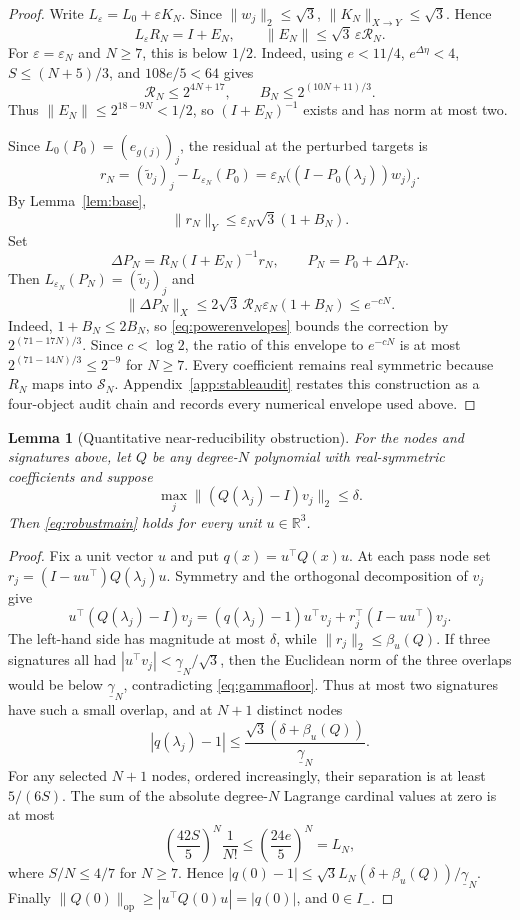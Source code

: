 \documentclass[11pt]{article}
\newtheorem{lemma}[theorem]{Lemma}
\theoremstyle{remark}
\newcommand{\R}{\mathbb{R}}
\newcommand{\cS}{\mathcal{S}}
\newcommand{\op}{\mathrm{op}}
\begin{document}
\begin{proof}
Write $L_\varepsilon=L_0+\varepsilon K_N$.  Since
$\|w_j\|_2\le\sqrt3$, $\|K_N\|_{X\to Y}\le\sqrt3$.  Hence
\[
 L_\varepsilon R_N=I+E_N,\qquad
 \|E_N\|\le\sqrt3\,\varepsilon\mathcal R_N.
\]
For $\varepsilon=\varepsilon_N$ and $N\ge7$, this is below $1/2$.  Indeed,
using $e<11/4$, $e^{\Delta\eta}<4$, $S\le(N+5)/3$, and
$108e/5<64$ gives
\begin{equation}\label{eq:powerenvelopes}
 \mathcal R_N\le2^{4N+17},\qquad
 B_N\le2^{(10N+11)/3}.
\end{equation}
Thus $\|E_N\|\le2^{18-9N}<1/2$, so $(I+E_N)^{-1}$ exists and has norm at
most two.

Since $L_0(P_0)=(e_{g(j)})_j$, the residual at the perturbed targets is
\[
 r_N=(\widetilde v_j)_j-L_{\varepsilon_N}(P_0)
 =\varepsilon_N\bigl((I-P_0(\lambda_j))w_j\bigr)_j.
\]
By Lemma~\ref{lem:base},
\[
 \|r_N\|_Y\le\varepsilon_N\sqrt3(1+B_N).
\]
Set
\[
 \Delta P_N=R_N(I+E_N)^{-1}r_N,
 \qquad P_N=P_0+\Delta P_N.
\]
Then $L_{\varepsilon_N}(P_N)=(\widetilde v_j)_j$ and
\[
 \|\Delta P_N\|_X
 \le2\sqrt3\,\mathcal R_N\varepsilon_N(1+B_N)\le e^{-cN}.
\]
Indeed, $1+B_N\le2B_N$, so \eqref{eq:powerenvelopes} bounds the correction
by $2^{(71-17N)/3}$.  Since $c<\log2$, the ratio of this envelope to
$e^{-cN}$ is at most $2^{(71-14N)/3}\le2^{-9}$ for $N\ge7$.
Every coefficient remains real symmetric because $R_N$ maps into $\cS_N$.
Appendix~\ref{app:stableaudit} restates this construction as a four-object
audit chain and records every numerical envelope used above.
\end{proof}

\begin{lemma}[Quantitative near-reducibility obstruction]\label{lem:robustcommuting}
For the nodes and signatures above, let $Q$ be any degree-$N$ polynomial with
real-symmetric coefficients and suppose
\[
 \max_j\|(Q(\lambda_j)-I)v_j\|_2\le\delta.
\]
Then \eqref{eq:robustmain} holds for every unit $u\in\R^3$.
\end{lemma}

\begin{proof}
Fix a unit vector $u$ and put $q(x)=u^\top Q(x)u$.  At each pass node set
$r_j=(I-uu^\top)Q(\lambda_j)u$.  Symmetry and the orthogonal decomposition of
$v_j$ give
\[
 u^\top(Q(\lambda_j)-I)v_j
 =(q(\lambda_j)-1)u^\top v_j+r_j^\top(I-uu^\top)v_j.
\]
The left-hand side has magnitude at most $\delta$, while
$\|r_j\|_2\le\beta_u(Q)$.  If three signatures all had
$|u^\top v_j|<\underline\gamma_N/\sqrt3$, then the Euclidean norm of the
three overlaps would be below $\underline\gamma_N$, contradicting
\eqref{eq:gammafloor}.  Thus at most two signatures have such a small overlap,
and at $N+1$ distinct nodes
\[
 |q(\lambda_j)-1|
 \le\frac{\sqrt3(\delta+\beta_u(Q))}{\underline\gamma_N}.
\]
For any selected $N+1$ nodes, ordered increasingly, their separation is at
least $5/(6S)$.  The sum of the absolute degree-$N$ Lagrange cardinal values
at zero is at most
\[
 \left(\frac{42S}{5}\right)^N\frac1{N!}
 \le\left(\frac{24e}{5}\right)^N=L_N,
\]
where $S/N\le4/7$ for $N\ge7$.  Hence
$|q(0)-1|\le\sqrt3L_N(\delta+\beta_u(Q))/\underline\gamma_N$.
Finally $\|Q(0)\|_{\op}\ge|u^\top Q(0)u|=|q(0)|$, and $0\in I_-$.
\end{proof}
\end{document}
